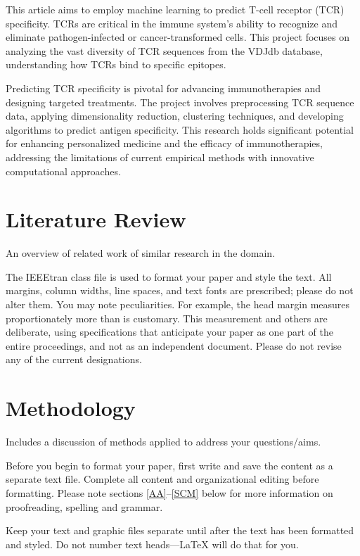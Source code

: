 \documentclass[conference]{IEEEtran}
\begin{document}
	This article aims to employ machine learning to predict T-cell receptor (TCR) specificity. TCRs are critical in the immune system's ability to recognize and eliminate pathogen-infected or cancer-transformed cells. This project focuses on analyzing the vast diversity of TCR sequences from the VDJdb database, understanding how TCRs bind to specific epitopes.
	
	Predicting TCR specificity is pivotal for advancing immunotherapies and designing targeted treatments. The project involves preprocessing TCR sequence data, applying dimensionality reduction, clustering techniques, and developing algorithms to predict antigen specificity. This research holds significant potential for enhancing personalized medicine and the efficacy of immunotherapies, addressing the limitations of current empirical methods with innovative computational approaches.
	
	
	\section{Literature Review}
	{\color{blue}An overview of related work of similar research in the domain.}
	
	The IEEEtran class file is used to format your paper and style the text. All margins, 
	column widths, line spaces, and text fonts are prescribed; please do not 
	alter them. You may note peculiarities. For example, the head margin
	measures proportionately more than is customary. This measurement 
	and others are deliberate, using specifications that anticipate your paper 
	as one part of the entire proceedings, and not as an independent document. 
	Please do not revise any of the current designations.
	
	\section{Methodology}
	{\color{blue}Includes a discussion of methods applied to address your questions/aims.}
	
	Before you begin to format your paper, first write and save the content as a 
	separate text file. Complete all content and organizational editing before 
	formatting. Please note sections \ref{AA}--\ref{SCM} below for more information on 
	proofreading, spelling and grammar.
	
	Keep your text and graphic files separate until after the text has been 
	formatted and styled. Do not number text heads---{\LaTeX} will do that 
	for you.
	
\end{document}
